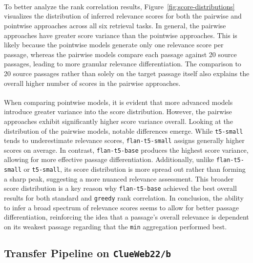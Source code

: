 \\\\\\
To better analyze the rank correlation results, Figure~\ref{fig:score-distributions} visualizes the distribution of inferred relevance scores for both the pairwise and pointwise approaches across all six retrieval tasks. In general, the pairwise approaches have greater score variance than the pointwise approaches. This is likely because the pointwise models generate only one relevance score per passage, whereas the pairwise models compare each passage against 20 source passages, leading to more granular relevance differentiation. The comparison to 20 source passages rather than solely on the target passage itself also explains the overall higher number of scores in the pairwise approaches.
\\\\
When comparing pointwise models, it is evident that more advanced models introduce greater variance into the score distribution. However, the pairwise approaches exhibit significantly higher score variance overall. Looking at the distribution of the pairwise models, notable differences emerge. While \texttt{t5-small} tends to underestimate relevance scores, \texttt{flan-t5-small} assigns generally higher scores on average. In contrast, \texttt{flan-t5-base} produces the highest score variance, allowing for more effective passage differentiation. Additionally, unlike \texttt{flan-t5-small} or \texttt{t5-small}, its score distribution is more spread out rather than forming a sharp peak, suggesting a more nuanced relevance assessment. This broader score distribution is a key reason why \texttt{flan-t5-base} achieved the best overall results for both standard and \texttt{greedy} rank correlation. In conclusion, the ability to infer a broad spectrum of relevance scores seems to allow for better passage differentiation, reinforcing the idea that a passage's overall relevance is dependent on its weakest passage regarding that the \texttt{min} aggregation performed best.

\pagebreak
\subsection{Transfer Pipeline on \texttt{ClueWeb22/b}}\label{eval-pairwise-preferences-target}

